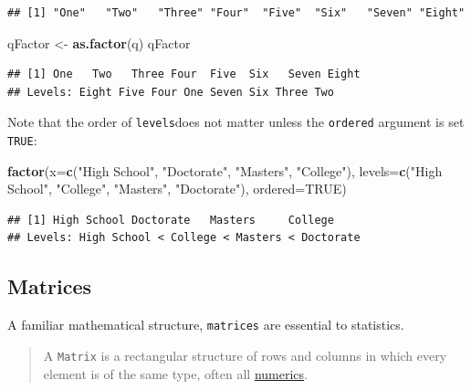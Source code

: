 \documentclass[]{book}
\newenvironment{Shaded}{\begin{snugshade}}{\end{snugshade}}
\newcommand{\DataTypeTok}[1]{\textcolor[rgb]{0.13,0.29,0.53}{#1}}
\newcommand{\KeywordTok}[1]{\textcolor[rgb]{0.13,0.29,0.53}{\textbf{#1}}}
\newcommand{\NormalTok}[1]{#1}
\newcommand{\OtherTok}[1]{\textcolor[rgb]{0.56,0.35,0.01}{#1}}
\newcommand{\StringTok}[1]{\textcolor[rgb]{0.31,0.60,0.02}{#1}}
\theoremstyle{definition}
\theoremstyle{definition}
\theoremstyle{definition}
\theoremstyle{remark}
\begin{document}
\begin{verbatim}
## [1] "One"   "Two"   "Three" "Four"  "Five"  "Six"   "Seven" "Eight"
\end{verbatim}

\begin{Shaded}
\begin{Highlighting}[]
\NormalTok{qFactor <-}\StringTok{ }\KeywordTok{as.factor}\NormalTok{(q)}
\NormalTok{qFactor}
\end{Highlighting}
\end{Shaded}

\begin{verbatim}
## [1] One   Two   Three Four  Five  Six   Seven Eight
## Levels: Eight Five Four One Seven Six Three Two
\end{verbatim}

Note that the order of \texttt{levels}does not matter unless the
\texttt{ordered} argument is set \texttt{TRUE}:

\begin{Shaded}
\begin{Highlighting}[]
\KeywordTok{factor}\NormalTok{(}\DataTypeTok{x=}\KeywordTok{c}\NormalTok{(}\StringTok{"High School"}\NormalTok{, }\StringTok{"Doctorate"}\NormalTok{, }\StringTok{"Masters"}\NormalTok{, }\StringTok{"College"}\NormalTok{),}
         \DataTypeTok{levels=}\KeywordTok{c}\NormalTok{(}\StringTok{"High School"}\NormalTok{, }\StringTok{"College"}\NormalTok{, }\StringTok{"Masters"}\NormalTok{, }\StringTok{"Doctorate"}\NormalTok{),}
         \DataTypeTok{ordered=}\OtherTok{TRUE}\NormalTok{)}
\end{Highlighting}
\end{Shaded}

\begin{verbatim}
## [1] High School Doctorate   Masters     College    
## Levels: High School < College < Masters < Doctorate
\end{verbatim}

\hypertarget{matrices}{%
\subsection{Matrices}\label{matrices}}

A familiar mathematical structure, \texttt{matrices} are essential to
statistics.

\begin{quote}
A \texttt{Matrix} is a rectangular structure of rows and columns in
which every element is of the same type, often all
\protect\hyperlink{numeric-data-types}{numerics}.
\end{quote}
\end{document}
